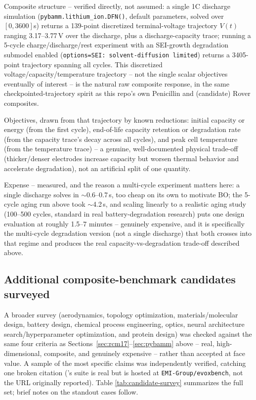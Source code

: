 \documentclass[11pt]{article}
\begin{document}
Composite structure -- verified directly, not assumed: a single 1C
discharge simulation (\texttt{pybamm.lithium\_ion.DFN()}, default
parameters, solved over $[0, 3600]$s) returns a 139-point discretized
terminal-voltage trajectory $V(t)$ ranging 3.17--3.77\,V over the
discharge, plus a discharge-capacity trace; running a 5-cycle
charge/discharge/rest experiment with an SEI-growth degradation submodel
enabled (\texttt{options={\textquotesingle}SEI{\textquotesingle}:
{\textquotesingle}solvent-diffusion limited{\textquotesingle}}) returns a
3405-point trajectory spanning all cycles. This discretized
voltage/capacity/temperature trajectory -- not the single scalar
objectives eventually of interest -- is the natural raw composite
response, in the same checkpointed-trajectory spirit as this repo's own
Penicillin and (candidate) Rover composites.

Objectives, drawn from that trajectory by known reductions: initial
capacity or energy (from the first cycle), end-of-life capacity retention
or degradation rate (from the capacity trace's decay across all cycles),
and peak cell temperature (from the temperature trace) -- a genuine,
well-documented physical trade-off (thicker/denser electrodes increase
capacity but worsen thermal behavior and accelerate degradation), not an
artificial split of one quantity.

Expense -- measured, and the reason a multi-cycle experiment matters here:
a single discharge solves in $\sim$0.6--0.7\,s, too cheap on its own to
motivate BO; the 5-cycle aging run above took $\sim$4.2\,s, and scaling
linearly to a realistic aging study (100--500 cycles, standard in real
battery-degradation research) puts one design evaluation at roughly
1.5--7 minutes -- genuinely expensive, and it is specifically the
multi-cycle degradation version (not a single discharge) that both
crosses into that regime and produces the real capacity-vs-degradation
trade-off described above.

\subsection{Additional composite-benchmark candidates surveyed}
\label{sec:more-candidates}

A broader survey (aerodynamics, topology optimization, materials/molecular
design, battery design, chemical process engineering, optics, neural
architecture search/hyperparameter optimization, and protein design) was
checked against the same four criteria as
Sections~\ref{sec:rcm17}--\ref{sec:pybamm} above -- real, high-dimensional,
composite, and genuinely expensive -- rather than accepted at face value.
A sample of the most specific claims was independently verified, catching
one broken citation (\citet{lu2023evoxbench}'s suite is real but is hosted
at \texttt{EMI-Group/evoxbench}, not the URL originally reported). Table
\ref{tab:candidate-survey} summarizes the full set; brief notes on the
standout cases follow.
\end{document}

